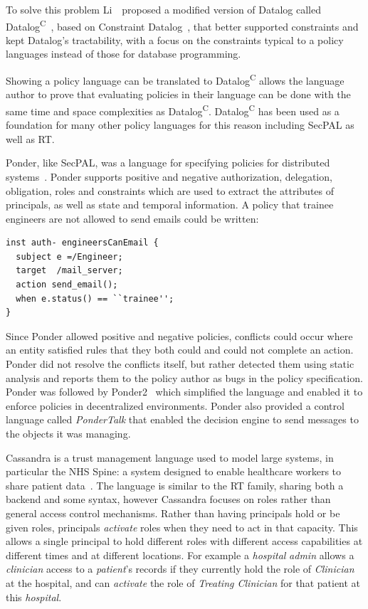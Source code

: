 \documentclass[thesis.tex]{subfiles}
\begin{document}
To solve this problem Li~\etal{}~proposed a modified version of
Datalog called Datalog\textsuperscript{C}~\cite{li_datalog_2003},
based on Constraint
Datalog~\cite{revesz_constraint_1995,revesz_safe_1998}, that better
supported constraints and kept Datalog's tractability, with a focus on
the constraints typical to a policy languages instead of those for
database programming.

Showing a policy language can be translated to Datalog\textsuperscript{C} allows the language author 
to prove that evaluating policies in their language can be done with the same time and space complexities as Datalog\textsuperscript{C}.
Datalog\textsuperscript{C} has been used as a foundation for many
other policy languages for this reason including SecPAL as well as RT.  

Ponder, like SecPAL, was a language for specifying policies for distributed
systems~\cite{damianou_ponder_2001}. Ponder supports positive and negative
authorization, delegation, obligation, roles and constraints which are used to
extract the attributes of principals, as well as state and temporal information.
A policy that trainee engineers are not allowed to send emails could be written:

\begin{lstlisting}
inst auth- engineersCanEmail {
  subject e =/Engineer;
  target  /mail_server;
  action send_email();
  when e.status() == ``trainee'';
}
\end{lstlisting}

Since Ponder allowed positive and negative policies, conflicts could occur where
an entity satisfied rules that they both could and could not complete an action.
Ponder did not resolve the conflicts itself, but rather detected them using
static analysis and reports them to the policy author as bugs in the policy
specification. Ponder was followed by Ponder2~\cite{twidle_ponder2:_2009} which
simplified the language and enabled it to enforce policies in decentralized
environments. Ponder also provided a control language called \emph{PonderTalk}
that enabled the decision engine to send messages to the objects it was
managing.

Cassandra is a trust management language used to model large systems,
in particular the NHS Spine: a system designed to enable healthcare
workers to share patient
data~\cite{becker_cassandra:_2004,becker_cassandra:_2004-1}.  The
language is similar to the RT family, sharing both a backend and some
syntax, however Cassandra focuses on roles rather than general access
control mechanisms.  Rather than having principals hold or be given
roles, principals \emph{activate} roles when they need to act in that
capacity.  This allows a single principal to hold different roles with
different access capabilities at different times and at different
locations.  For example a \emph{hospital} \emph{admin} allows a
\emph{clinician} access to a \emph{patient}'s records if they
currently hold the role of \emph{Clinician} at the hospital, and can
\emph{activate} the role of \emph{Treating Clinician} for that patient
at this \emph{hospital}.
\end{document}
